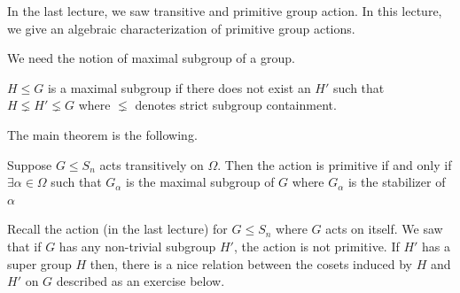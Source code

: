 
In the last lecture, we saw transitive and primitive group action. In this
lecture, we give an algebraic characterization of primitive group actions.

We need the notion of maximal subgroup of a group.
\begin{definition}
$H \leq G$ is a maximal subgroup if there does not exist an $H'$ such that 
$H \lneq H' \lneq G$ where $\lneq$ denotes strict subgroup containment.
\end{definition}

The main theorem is the following.
\begin{theorem}
	Suppose $G \le S_n$ acts transitively on $\Omega$. Then the action is
	primitive if and only if $\exists \alpha \in \Omega$ such that
	$G_{\alpha}$ is the maximal subgroup of $G$ where $G_\alpha$ is the
	stabilizer of $\alpha$
	\label{thm:primitive-action}
\end{theorem}

Recall the action (in the last lecture) for $G \le S_n$ where $G$ acts on
itself. We saw that if $G$ has any non-trivial subgroup $H'$, the action is
not primitive. If $H'$ has a super group $H$ then, there is a nice relation
between the cosets induced by $H$ and $H'$ on $G$ described as an exercise
below.

